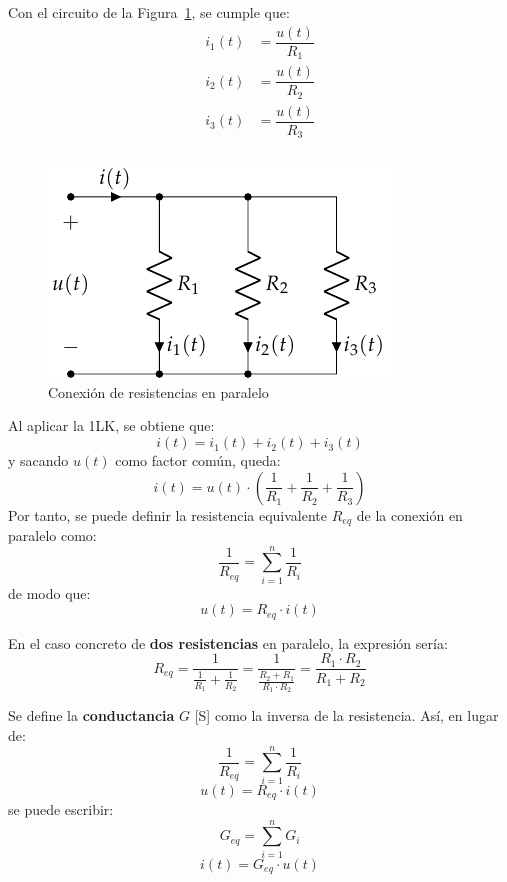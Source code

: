 			Con el circuito de la Figura~\ref{fig.resistencias-paralelo}, se cumple que:
		\begin{align*}
			i_1(t) &= \dfrac{u(t)}{R_1}\\
			i_2(t) &= \dfrac{u(t)}{R_2}\\
			i_3(t) &= \dfrac{u(t)}{R_3}\\
		\end{align*}
		\begin{figure}[H]
			\centering
			\includegraphics[width=0.35\linewidth]{../figs/AsociacionParalelo.pdf}
			\caption{Conexión de resistencias en paralelo}
			\label{fig.resistencias-paralelo}
		\end{figure}
		Al aplicar la 1LK, se obtiene que: 
		\begin{equation*}
			i(t) = i_1(t) + i_2(t) + i_3(t)
		\end{equation*}
		y sacando $u(t)$ como factor común, queda:
		\begin{equation*}
			i(t) = u(t) \cdot \left(\frac{1}{R_1} + \frac{1}{R_2} + \frac{1}{R_3}\right)
		\end{equation*}
		Por tanto, se puede definir la resistencia equivalente $R_{eq}$ de la conexión en paralelo como:
		\begin{equation}
			\boxed{\dfrac{1}{R_{eq}} = \sum_{i = 1}^n \dfrac{1}{R_i}}
		\end{equation}
		de modo que:
		\begin{equation*}
			u(t) = R_{eq} \cdot i(t)
		\end{equation*}
		
		\begin{remark}
			En el caso concreto de \textbf{dos resistencias} en paralelo, la expresión sería: 
			\begin{equation*}
				R_{eq}=\dfrac{1}{\frac{1}{R_1}+\frac{1}{R_2}}=\dfrac{1}{\frac{R_2+R_1}{R_1\cdot R_2}}=\dfrac{R_1\cdot R_2}{R_1+R_2}
			\end{equation*}
		\end{remark}
		
		Se define la \textbf{conductancia} $G$ [S] como la inversa de la resistencia. Así, en lugar de:
		\begin{equation*}
			\dfrac{1}{R_{eq}} = \sum_{i = 1}^n \dfrac{1}{R_i}
		\end{equation*}
		\begin{equation*}
			u(t) = R_{eq} \cdot i(t)
		\end{equation*}
		se puede escribir:
		\begin{equation}
			\boxed{G_{eq} = \sum_{i = 1}^n G_i}
		\end{equation}
		\begin{equation*}
			i(t) = G_{eq} \cdot u(t)
		\end{equation*}
		
